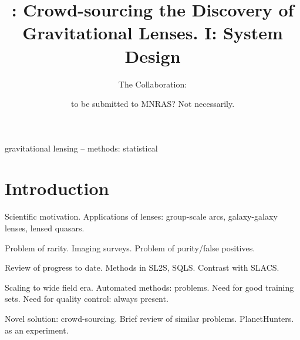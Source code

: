 \documentclass[useAMS,usenatbib,a4paper]{mn2e}
\title[\sw I]
{\SW: Crowd-sourcing the Discovery of Gravitational Lenses. 
I: System Design}
\author[The \SW Collaboration]{%
  The \SW Collaboration:
}
\begin{document}
             
\date{to be submitted to MNRAS? Not necessarily.}
\pagerange{\pageref{firstpage}--\pageref{lastpage}}

\maketitle           

\label{firstpage}


\begin{abstract} 


\end{abstract}


\begin{keywords}
  gravitational lensing   --
  methods: statistical    
\end{keywords}

\setcounter{footnote}{1}


\section{Introduction}
\label{sec:intro}

Scientific motivation. Applications of lenses: group-scale arcs,
galaxy-galaxy lenses, lensed quasars. 

Problem of rarity. Imaging surveys. Problem of purity/false positives.

Review of progress to date. Methods in SL2S, SQLS. Contrast with SLACS. 

Scaling to wide field era. Automated methods: problems. Need for good
training sets. Need for quality control: always present.

Novel solution: crowd-sourcing. Brief review of similar problems.
PlanetHunters. \sw as an experiment.
\end{document}
